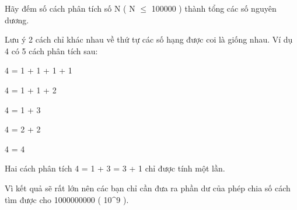 Hãy đếm số cách phân tích số N ( N $\le$ 100000 ) thành tổng các số nguyên dương.   


   Lưu ý 2 cách chỉ khác nhau về thứ tự các số hạng được coi là giống nhau. Ví dụ 4 có 5 cách phân tích sau:   


   4 = 1 + 1 + 1 + 1   


   4 = 1 + 1 + 2   


   4 = 1 + 3   


   4 = 2 + 2   


   4 = 4   





   Hai cách phân tích 4 = 1 + 3 = 3 + 1 chỉ được tính một lần.   


   Vì kết quả sẽ rất lớn nên các bạn chỉ cần đưa ra phần dư của phép chia số cách tìm được cho 1000000000 ( 10^9 ).